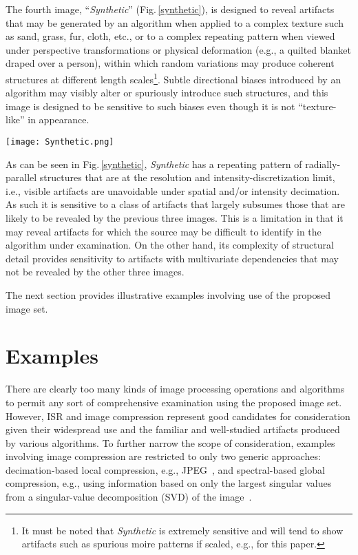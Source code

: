\documentclass{article}
\begin{document}
The fourth image, ``{\em Synthetic}'' (Fig.\,\ref{synthetic}), 
is designed to reveal artifacts that may
be generated by an algorithm when applied to a complex texture such
as sand, grass, fur, cloth, etc., or to a complex repeating pattern when
viewed under perspective transformations or physical deformation (e.g.,
a quilted blanket draped over a person), within which random variations 
may produce coherent structures at different length 
scales\footnote{It must be noted that {\em Synthetic} is extremely
sensitive and will tend to show artifacts such as spurious moire patterns
if scaled, e.g., for this paper.}. Subtle 
directional biases introduced by an algorithm may visibly alter or spuriously
introduce such structures, and this image is designed to be sensitive to
such biases even though it is not ``texture-like'' in appearance.
\begin{figure*}
   \centering
   \texttt{[image: Synthetic.png]}
\caption{``Synthetic'' - Complex patterns.}
\label{synthetic}
\end{figure*}

As can be seen in Fig.\,\ref{synthetic},
{\em Synthetic} has a repeating pattern of radially-parallel structures that
are at the resolution and intensity-discretization limit, i.e., visible artifacts
are unavoidable under spatial and/or intensity decimation. As such it is
sensitive to a class of artifacts that largely subsumes those that are
likely to be revealed by the previous three images. This is a limitation in that
it may reveal artifacts for which the source may be difficult to identify
in the algorithm under examination. On the other hand, its complexity of
structural detail provides sensitivity to artifacts with multivariate
dependencies that may not be revealed by the other three images. 

The next section provides illustrative examples involving use of the
proposed image set.

\section{Examples}

There are clearly too many kinds of image processing operations
and algorithms to permit any sort of comprehensive examination
using the proposed image set. However, ISR and  image compression
represent good candidates for consideration given their
widespread use and the familiar and well-studied artifacts 
produced by various algorithms. To further narrow the scope 
of consideration, examples involving image compression are
restricted to only two generic approaches: decimation-based
local compression, e.g., JPEG~\cite{JPEG}, and spectral-based global 
compression, e.g., using information based on only the
largest singular values from a singular-value
decomposition (SVD) of the image~\cite{SVD}.
\end{document}

